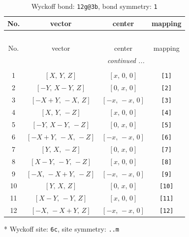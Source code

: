 \documentclass[fleqn,8pt]{jsarticle}
\begin{document}
\begin{longtable}{cccc}
\caption{Wyckoff bond: {\tt 12g@3b}, bond symmetry: {\tt 1}}
 \\
 \hline \hline
No. & vector & center & mapping \\ \hline \endfirsthead

\multicolumn{3}{l}{\tablename\ \thetable{}} \\
 \hline \hline
No. & vector & center & mapping \\ \hline \endhead

 \hline \hline
\multicolumn{3}{r}{\footnotesize\it continued ...} \\ \endfoot

 \hline \hline
\multicolumn{3}{r}{} \\ \endlastfoot

1 & $\left[ X,\, Y,\, Z \right]$ & $\left[ x,\, 0,\, 0 \right]$ & {\tt [1]} \\ \hline
2 & $\left[ - Y,\, X - Y,\, Z \right]$ & $\left[ 0,\, x,\, 0 \right]$ & {\tt [2]} \\ \hline
3 & $\left[ - X + Y,\, - X,\, Z \right]$ & $\left[ - x,\, - x,\, 0 \right]$ & {\tt [3]} \\ \hline
4 & $\left[ X,\, Y,\, - Z \right]$ & $\left[ x,\, 0,\, 0 \right]$ & {\tt [4]} \\ \hline
5 & $\left[ - Y,\, X - Y,\, - Z \right]$ & $\left[ 0,\, x,\, 0 \right]$ & {\tt [5]} \\ \hline
6 & $\left[ - X + Y,\, - X,\, - Z \right]$ & $\left[ - x,\, - x,\, 0 \right]$ & {\tt [6]} \\ \hline
7 & $\left[ Y,\, X,\, - Z \right]$ & $\left[ 0,\, x,\, 0 \right]$ & {\tt [7]} \\ \hline
8 & $\left[ X - Y,\, - Y,\, - Z \right]$ & $\left[ x,\, 0,\, 0 \right]$ & {\tt [8]} \\ \hline
9 & $\left[ - X,\, - X + Y,\, - Z \right]$ & $\left[ - x,\, - x,\, 0 \right]$ & {\tt [9]} \\ \hline
10 & $\left[ Y,\, X,\, Z \right]$ & $\left[ 0,\, x,\, 0 \right]$ & {\tt [10]} \\ \hline
11 & $\left[ X - Y,\, - Y,\, Z \right]$ & $\left[ x,\, 0,\, 0 \right]$ & {\tt [11]} \\ \hline
12 & $\left[ - X,\, - X + Y,\, Z \right]$ & $\left[ - x,\, - x,\, 0 \right]$ & {\tt [12]} \\
\end{longtable}
* Wyckoff site: {\tt 6c}, site symmetry: {\tt ..m}
\renewcommand{\arraystretch}{1.2}
\end{document}
